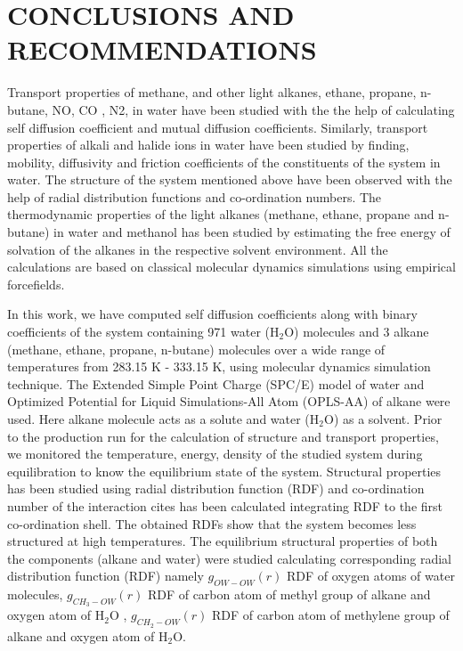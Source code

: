 \chapter{CONCLUSIONS AND RECOMMENDATIONS} \label{chap:5}

Transport  properties of methane, and other light alkanes, ethane, propane, n-butane,  NO, CO , N2, in water have been studied with the  the help of calculating  self diffusion coefficient and mutual diffusion coefficients. Similarly, transport properties of alkali and halide ions in water have been studied by finding, mobility, diffusivity and friction coefficients of the constituents of the system in water. The structure of the system mentioned above have been  observed with the help of radial distribution functions and co-ordination numbers. The thermodynamic properties of the light alkanes 
(methane, ethane, propane and n-butane) in water and methanol has been studied by estimating the free energy of solvation of the alkanes in the respective solvent environment. All the calculations are based on  classical molecular dynamics simulations using empirical forcefields.

 In this work, we have computed self diffusion coefficients along with binary coefficients of the system containing 971 water (H$_\mathrm{2}$O) molecules and 3 alkane (methane, ethane, propane, n-butane) molecules over a wide range of  temperatures from 283.15 K - 333.15 K,  using molecular dynamics simulation technique. The Extended Simple Point Charge (SPC/E)  model of water and Optimized Potential for Liquid Simulations-All Atom (OPLS-AA) of alkane were used. Here alkane molecule acts as a solute and water (H$_\mathrm{2}$O) as a solvent. Prior to the production run for the calculation of structure and transport properties, we monitored the temperature, energy, density of  the studied  system during equilibration to know the equilibrium state of the system. Structural properties has been studied using radial distribution function (RDF) and co-ordination number of the interaction cites has been calculated integrating RDF to the first co-ordination shell. The obtained RDFs  show that the system becomes less structured at high temperatures. The equilibrium structural properties of both the components (alkane and water) were studied calculating corresponding radial distribution function (RDF) namely $g_{OW-OW}(r)$ RDF of oxygen atoms of water molecules, $g_{CH_3-OW}(r)$ RDF of carbon atom of methyl group of alkane and oxygen atom of H$_\mathrm{2}$O , $g_{CH_2-OW}(r)$ RDF of carbon atom of methylene group of alkane and  oxygen atom of H$_\mathrm{2}$O.
 
